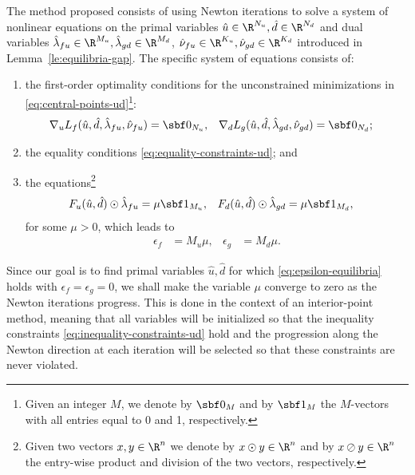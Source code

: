 \documentclass[11pt]{article}
\begin{document}
The method proposed consists of using Newton iterations to solve a
system of nonlinear equations on the primal variables $\hat
u\in\R^{N_u},\hat d\in\R^{N_d}$ and dual variables
$\hat\lambda_{fu}\in\R^{M_u},\hat\lambda_{gd}\in\R^{M_d}$,
$\hat\nu_{fu}\in\R^{K_u},\hat\nu_{gd}\in\R^{K_d}$ introduced in
Lemma~\ref{le:equilibria-gap}. The specific system of equations
consists of:
\begin{enumerate}
\item the first-order optimality conditions for the unconstrained
  minimizations in \eqref{eq:central-points-ud}\footnote{Given an integer
    $M$, we denote by $\sbf 0_M$ and by $\sbf 1_M$ the $M$-vectors
    with all entries equal to 0 and 1, respectively.}:
  \begin{align}\label{eq:equilibrium}
    \nabla_u L_f(\hat u,\hat d,\hat\lambda_{fu},\hat\nu_{fu})&=\sbf 0_{N_u}, &
    \nabla_d L_g(\hat u,\hat d,\hat\lambda_{gd},\hat\nu_{gd})&=\sbf 0_{N_d}; &
  \end{align}
\item the equality conditions \eqref{eq:equality-constraints-ud}; and
\item the equations\footnote{Given two vectors $x,y\in\R^n$ we denote by
    $x\odot y\in\R^n$ and by $x\oslash y\in\R^n$ the entry-wise product and
    division of the two vectors, respectively.}
  \begin{align}\label{eq:barrier-ud}
    F_u(\hat u,\hat d)\odot\hat\lambda_{fu}&=\mu\sbf 1_{M_u}, &
    F_d(\hat u,\hat d)\odot\hat\lambda_{gd}&=\mu\sbf 1_{M_d}, &
  \end{align}
  for some $\mu>0$, which leads to
  \begin{align*}
    \epsilon_f&=M_u \mu, & \epsilon_g&=M_d \mu.
  \end{align*}
\end{enumerate}
Since our goal is to find primal variables $\hat u,\hat d$ for which
\eqref{eq:epsilon-equilibria} holds with $\epsilon_f=\epsilon_g=0$, we shall make
the variable $\mu$ converge to zero as the Newton iterations
progress. This is done in the context of an interior-point method,
meaning that all variables will be initialized so that the inequality
constraints \eqref{eq:inequality-constraints-ud} hold and the progression
along the Newton direction at each iteration will be selected so that
these constraints are never violated.

\medskip
\end{document}
